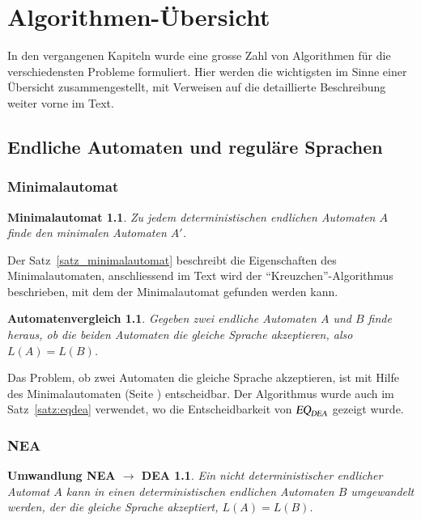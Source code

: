 \chapter{Algorithmen-Übersicht\label{skript:algorithmen}}
\rhead{}
In den vergangenen Kapiteln wurde eine grosse Zahl von Algorithmen
für die verschiedensten Probleme formuliert. Hier werden die wichtigsten
im Sinne einer Übersicht zusammengestellt, mit Verweisen auf die 
detaillierte Beschreibung weiter vorne im Text.
\section{Endliche Automaten und reguläre Sprachen}
\subsection{Minimalautomat}
\newtheorem*{Minimalautomat}{Minimalautomat}
\begin{Minimalautomat}
Zu jedem deterministischen endlichen Automaten $A$ finde den minimalen
Automaten $A'$.
\end{Minimalautomat}
Der Satz~\ref{satz_minimalautomat} beschreibt die Eigenschaften des
Minimalautomaten, anschliessend im Text wird der ``Kreuzchen''-Algorithmus
beschrieben, mit dem der Minimalautomat gefunden werden kann.

\newtheorem*{Automatenvergleich}{Automatenvergleich}
\begin{Automatenvergleich}
Gegeben zwei endliche Automaten $A$ und $B$ finde heraus, ob die
beiden Automaten die gleiche Sprache akzeptieren, also $L(A)=L(B)$.
\end{Automatenvergleich}
Das Problem, ob zwei Automaten die gleiche Sprache akzeptieren,
ist mit Hilfe des Minimalautomaten (Seite \pageref{algorithmus:minimalautomat})
entscheidbar. 
Der Algorithmus wurde auch im Satz~\ref{satz:eqdea} verwendet, wo die
Entscheidbarkeit von $\textsl{EQ}_\textsl{DEA}$ gezeigt wurde.


\subsection{NEA}
\newtheorem*{NEA}{Umwandlung NEA $\to$ DEA}
\begin{NEA}
Ein nicht deterministischer endlicher Automat $A$ kann in einen 
deterministischen endlichen Automaten $B$ umgewandelt werden, der die
gleiche Sprache akzeptiert, $L(A)=L(B)$.
\end{NEA}

